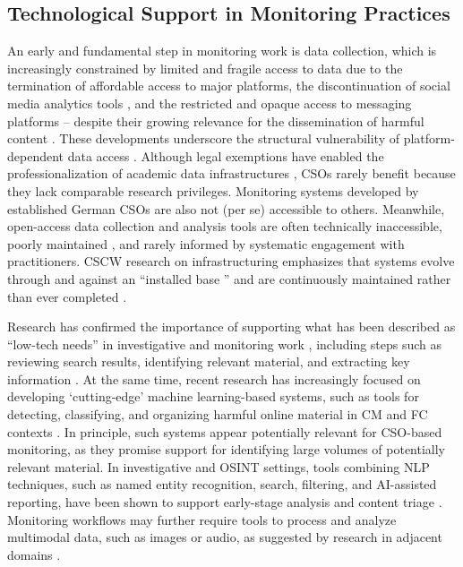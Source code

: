 \documentclass[acmsmall]{acmart}
\begin{document}
\subsection{Technological Support in Monitoring Practices}
\label{ssec:technological_support}

An early and fundamental step in monitoring work is data collection, which is increasingly constrained by limited and fragile access to data due to the termination of affordable access to major platforms, the discontinuation of social media analytics tools \cite{ortutay_meta_2024}, and the restricted and opaque access to messaging platforms -- despite their growing relevance for the dissemination of harmful content \cite{barbosa_not_2019,nordis_policy_2022,hrckova_autonomation_2024}. These developments underscore the structural vulnerability of platform-dependent data access \cite{nordis_policy_2022}. 
Although legal exemptions have enabled the professionalization of academic data infrastructures \cite{gesis_telegram_toolkit}, CSOs rarely benefit because they lack comparable research privileges. Monitoring systems developed by established German CSOs \cite{cemas_about_2025, isd_digital_2025} are also not (per se) accessible to others. Meanwhile, open-access data collection and analysis tools \cite{primig_introducing_2024,silva_telegramscrap_2024,ruscica_telecatch_2025,peeters_4cat_2022} are often technically inaccessible, poorly maintained \cite{schinas_open-source_2017}, and rarely informed by systematic engagement with practitioners. CSCW research on infrastructuring emphasizes that systems evolve through and against an ``installed base '' \cite{neumann_making_1996} and are continuously maintained rather than ever completed \cite{karasti_infrastructuring_2014}.

Research has confirmed the importance of supporting what has been described as ``low-tech needs'' in investigative and monitoring work \cite{hancock_seeing_2024}, including steps such as reviewing search results, identifying relevant material, and extracting key information \cite{mckeown_investigating_2014}.
At the same time, recent research has increasingly focused on developing `cutting-edge' machine learning-based systems, such as tools for detecting, classifying, and organizing harmful online material in CM \cite{seering_chillbot_2024,schluger_proactive_2022} and FC contexts \cite{liu_human-centered_2024,hrckova_autonomation_2024,das_state_2023,guo_2024}. In principle, such systems appear potentially relevant for CSO-based monitoring, as they promise support for identifying large volumes of potentially relevant material. In investigative and OSINT settings, tools combining NLP techniques, such as named entity recognition, search, filtering, and AI-assisted reporting, have been shown to support early-stage analysis and content triage \cite{skopik_osint_nlp_2024}. 
Monitoring workflows may further require tools to process and analyze multimodal data, such as images or audio, as suggested by research in adjacent domains \cite{cifliku_save_2025,wolfe_implications_2024}.
\end{document}
